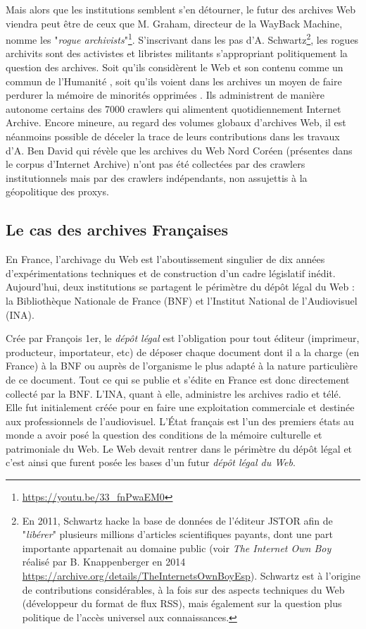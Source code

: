 \documentclass[symmetric,justified,marginals=raggedouter]{tufte-book}
\begin{document}
Mais alors que les institutions semblent s'en détourner, le futur des archives Web viendra peut être de ceux que M. Graham, directeur de la WayBack Machine, nomme les "\textit{rogue archivists}"\footnote{\url{https://youtu.be/33_fnPwaEM0}}. S'inscrivant dans les pas d'A. Schwartz\footnote{En 2011, Schwartz hacke la base de données de l'éditeur JSTOR afin de "\textit{libérer}" plusieurs millions d'articles scientifiques payants, dont une part importante appartenait au domaine public (voir \textit{The Internet Own Boy} réalisé par B. Knappenberger en 2014 \url{https://archive.org/details/TheInternetsOwnBoyEsp}). Schwartz est à l'origine de contributions considérables, à la fois sur des aspects techniques du Web (développeur du format de flux RSS), mais également sur la question plus politique de l'accès universel aux connaissances.}, les rogues archivits sont des activistes et libristes militants s'appropriant politiquement la question des archives. Soit qu'ils considèrent le Web et son contenu comme un commun de l'Humanité \citep{coriat_retour_2015}, soit qu'ils voient dans les archives un moyen de faire perdurer la mémoire de minorités opprimées \citep{de_kosnik_rogue_2016}. Ils administrent de manière autonome certains des 7000 crawlers qui alimentent quotidiennement Internet Archive. Encore mineure, au regard des volumes globaux d'archives Web, il est néanmoins possible de déceler la trace de leurs contributions dans les travaux d'A. Ben David \citep{ben-david_internet_2018} qui révèle que les archives du Web Nord Coréen (présentes dans le corpus d'Internet Archive) n'ont pas été collectées par des crawlers institutionnels mais par des crawlers indépendants, non assujettis à la géopolitique des proxys.       

\subsection{Le cas des archives Françaises}

\noindent En France, l'archivage du Web est l'aboutissement singulier de dix années d'expérimentations techniques et de construction d'un cadre législatif inédit. Aujourd'hui, deux institutions se partagent le périmètre du dépôt légal du Web : la Bibliothèque Nationale de France (BNF) et l'Institut National de l'Audiovisuel (INA). 

Crée par François 1er, le \textit{dépôt légal} est l'obligation pour tout éditeur (imprimeur, producteur, importateur, etc) de déposer chaque document dont il a la charge (en France) à la BNF ou auprès de l'organisme le plus adapté à la nature particulière de ce document. Tout ce qui se publie et s'édite en France est donc directement collecté par la BNF. L'INA, quant à elle, administre les archives radio et télé. Elle fut initialement créée pour en faire une exploitation commerciale et destinée aux professionnels de l'audiovisuel. L'État français est l'un des premiers états au monde a avoir posé la question des conditions de la mémoire culturelle et patrimoniale du Web. Le Web devait rentrer dans le périmètre du dépôt légal et c'est ainsi que furent posée les bases d'un futur \textit{dépôt légal du Web}.
\end{document}
